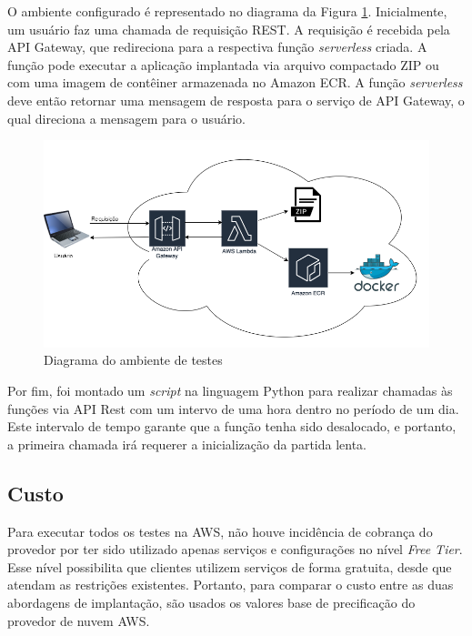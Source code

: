 \documentclass[conference]{IEEEtran}
\begin{document}
O ambiente configurado é representado no diagrama da Figura \ref{fig:env_diagram}. Inicialmente, um usuário faz uma chamada de requisição REST. A requisição é recebida pela API Gateway, que redireciona para a respectiva função \textit{serverless} criada. A função pode executar a aplicação implantada via arquivo compactado ZIP ou com uma imagem de contêiner armazenada no Amazon ECR. A função \textit{serverless} deve então retornar uma mensagem de resposta para o serviço de API Gateway, o qual direciona a mensagem para o usuário.

\begin{figure}[H]
    \centering 
    \includegraphics [width=\linewidth]{images/environment-diagram-PT.png}
    \par
    \caption{Diagrama do ambiente de testes}
    \label{fig:env_diagram}
\end{figure}

Por fim, foi montado um \textit{script} na linguagem Python para realizar chamadas às funções via API Rest com um intervo de uma hora dentro no período de um dia. Este intervalo de tempo garante que a função tenha sido desalocado, e portanto, a primeira chamada irá requerer a inicialização da partida lenta.


\subsection{Custo}
\label{subsec:cost}

Para executar todos os testes na AWS, não houve incidência de cobrança do provedor por ter sido utilizado apenas serviços e configurações no nível \textit{Free Tier}. Esse nível possibilita que clientes utilizem serviços de forma gratuita, desde que atendam as restrições existentes. Portanto, para comparar o custo entre as duas abordagens de implantação, são usados os valores base de precificação do provedor de nuvem AWS.
\end{document}
